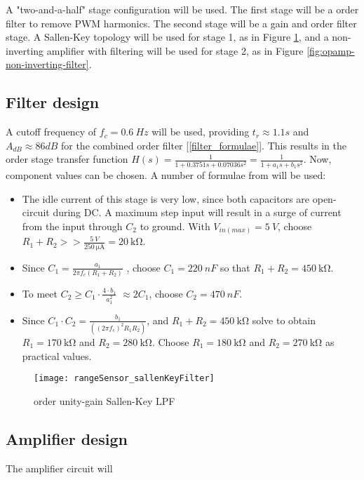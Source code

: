 A "two-and-a-half" stage configuration will be used. The first stage will be a  order filter to remove PWM harmonics.
The second stage will be a gain and  order filter stage. A Sallen-Key topology will be used for stage 1,
as in Figure \ref{fig:sallenKeyFilter}, and a non-inverting amplifier with filtering will be used for stage 2, as in Figure \ref{fig:opamp-non-inverting-filter}.

\subsection{Filter design}

A cutoff frequency of $f_c = \SI{0.6}{Hz}$ will be used, providing $t_r \approx 1.1 s$ and $A_{dB} \approx 86 dB $ for the combined  order filter [\ref{filter_formulae}].
This results in the  order stage transfer function $H(s) = \frac{1}{1 + 0.3751 s + 0.07036 s^2} = \frac{1}{1 + a_1 s + b_1 s^2}$. Now, component values can be chosen.
A number of formulae from \cite{filterDesign} will be used:

\begin{itemize}
  \item The idle current of this stage is very low, since both capacitors are open-circuit during DC. A maximum step input will result in a surge of current from the input through $C_2$ to ground.
        With $V_{in(max)} = \SI{5}{V}$, choose $R_1 + R_2 >> \frac{\SI{5}{V}}{\SI{250}{\micro\ampere}} = \SI{20}{\kilo\ohm}$.
  \item Since $C_1 = \frac{a_1}{2 \pi f_c (R_1 + R_2)}$ \cite{filterDesign}, choose $C_1 = \SI{220}{nF}$ so that $R_1 + R_2 = \SI{450}{\kilo\ohm}$.
  \item To meet $C_2 \geq C_1 \cdot \frac{4 \cdot b_1}{a_1 ^2} $\cite{filterDesign} $\approx 2 C_1 $, choose $C_2 = \SI{470}{nF}$.
  \item Since $C_1 \cdot C_2 = \frac{b_1}{((2 \pi f_c)^2 R_1 R_2)}$, and $R_1 + R_2 = \SI{450}{\kilo\ohm}$ solve to obtain $R_1 = \SI{170}{\kilo\ohm}$ and $R_2 = \SI{280}{\kilo\ohm}$.
        Choose $R_1 = \SI{180}{\kilo\ohm}$ and $R_2 = \SI{270}{\kilo\ohm}$ as practical values.
\end{itemize}

\begin{figure}[!htb]
  \centering
  \texttt{[image: rangeSensor\_sallenKeyFilter]}
  \caption{ order unity-gain Sallen-Key LPF \cite{filterDesign}}
  \label{fig:sallenKeyFilter}
\end{figure}

\subsection{Amplifier design}

The amplifier circuit will 